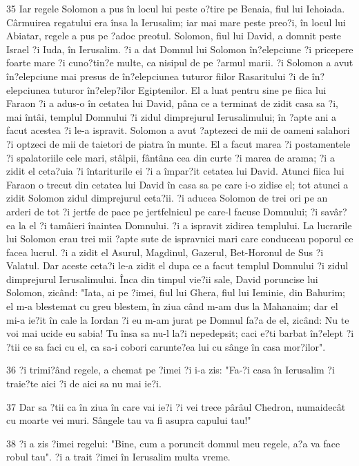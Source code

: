 \par 35 Iar regele Solomon a pus în locul lui peste o?tire pe Benaia, fiul lui Iehoiada. Cârmuirea regatului era însa la Ierusalim; iar mai mare peste preo?i, în locul lui Abiatar, regele a pus pe ?adoc preotul. Solomon, fiul lui David, a domnit peste Israel ?i Iuda, în Ierusalim. ?i a dat Domnul lui Solomon în?elepciune ?i pricepere foarte mare ?i cuno?tin?e multe, ca nisipul de pe ?armul marii. ?i Solomon a avut în?elepciune mai presus de în?elepciunea tuturor fiilor Rasaritului ?i de în?elepciunea tuturor în?elep?ilor Egiptenilor. El a luat pentru sine pe fiica lui Faraon ?i a adus-o în cetatea lui David, pâna ce a terminat de zidit casa sa ?i, mai întâi, templul Domnului ?i zidul dimprejurul Ierusalimului; în ?apte ani a facut acestea ?i le-a ispravit. Solomon a avut ?aptezeci de mii de oameni salahori ?i optzeci de mii de taietori de piatra în munte. El a facut marea ?i postamentele ?i spalatoriile cele mari, stâlpii, fântâna cea din curte ?i marea de arama; ?i a zidit el ceta?uia ?i întariturile ei ?i a împar?it cetatea lui David. Atunci fiica lui Faraon o trecut din cetatea lui David în casa sa pe care i-o zidise el; tot atunci a zidit Solomon zidul dimprejurul ceta?ii. ?i aducea Solomon de trei ori pe an arderi de tot ?i jertfe de pace pe jertfelnicul pe care-l facuse Domnului; ?i savâr?ea la el ?i tamâieri înaintea Domnului. ?i a ispravit zidirea templului. La lucrarile lui Solomon erau trei mii ?apte sute de ispravnici mari care conduceau poporul ce facea lucrul. ?i a zidit el Asurul, Magdinul, Gazerul, Bet-Horonul de Sus ?i Valatul. Dar aceste ceta?i le-a zidit el dupa ce a facut templul Domnului ?i zidul dimprejurul Ierusalimului. Înca din timpul vie?ii sale, David poruncise lui Solomon, zicând: "Iata, ai pe ?imei, fiul lui Ghera, fiul lui Ieminie, din Bahurim; el m-a blestemat cu greu blestem, în ziua când m-am dus la Mahanaim; dar el mi-a ie?it în cale la Iordan ?i eu m-am jurat pe Domnul fa?a de el, zicând: Nu te voi mai ucide eu sabia! Tu însa sa nu-l la?i nepedepsit; caci e?ti barbat în?elept ?i ?tii ce sa faci cu el, ca sa-i cobori carunte?ea lui cu sânge în casa mor?ilor".
\par 36 ?i trimi?ând regele, a chemat pe ?imei ?i i-a zis: "Fa-?i casa în Ierusalim ?i traie?te aici ?i de aici sa nu mai ie?i.
\par 37 Dar sa ?tii ca în ziua în care vai ie?i ?i vei trece pârâul Chedron, numaidecât cu moarte vei muri. Sângele tau va fi asupra capului tau!"
\par 38 ?i a zis ?imei regelui: "Bine, cum a poruncit domnul meu regele, a?a va face robul tau". ?i a trait ?imei în Ierusalim multa vreme.
